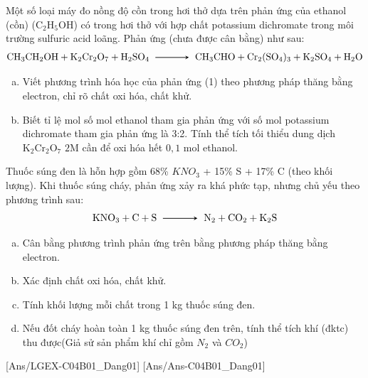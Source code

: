 	\begin{bt}
		Một số loại máy đo nồng độ cồn trong hơi thở dựa trên phản ứng của ethanol (cồn) ($\mathrm{C}_2\mathrm{H}_5\mathrm{OH}$) có trong hơi thở với hợp chất potassium dichromate trong môi trường sulfuric acid loãng. Phản ứng (chưa được cân bằng) như sau:
		\[\mathrm{CH_3CH_2OH} + \mathrm{K_2Cr_2O_7} + \mathrm{H_2SO_4} \xrightarrow \mathrm{CH_3CHO} + \mathrm{Cr_2(SO_4)_3} + \mathrm{K_2SO_4} + \mathrm{H_2O}
		\]
		\begin{enumerate}[a)]
			\item  Viết phương trình hóa học của phản ứng (1) theo phương pháp thăng bằng electron, chỉ rõ chất oxi hóa, chất khử.
			\item  Biết tỉ lệ mol số mol ethanol tham gia phản ứng với số mol potassium dichromate tham gia phản ứng là 3:2. Tính thể tích tối thiểu dung dịch $\mathrm{K}_2\mathrm{Cr}_2\mathrm{O}_7$  $2\mathrm{M}$ cần để oxi hóa hết $0{,}1$ mol ethanol.
		\end{enumerate}
		\loigiai{}
	\end{bt}
	\begin{bt}
		Thuốc súng đen là hỗn hợp gồm 68\% $KNO_3$ + 15\% S + 17\% C (theo khối lượng). Khi thuốc súng cháy, phản ứng xảy ra khá phức tạp, nhưng chủ yếu theo phương trình sau:
		\[\mathrm{KNO_3} + \mathrm{C} + \mathrm{S} \xrightarrow \mathrm{N_2} + \mathrm{CO_2} + \mathrm{K_2S}\]
		\begin{enumerate}[a)]
			\item  Cân bằng phương trình phản ứng trên bằng phương pháp thăng bằng electron.
			\item  Xác định chất oxi hóa, chất khử.
			\item  Tính khối lượng mỗi chất trong 1 kg thuốc súng đen.
			\item  Nếu đốt cháy hoàn toàn 1 kg thuốc súng đen trên, tính thể tích khí (đktc)  thu được(Giả sử sản phẩm khí chỉ gồm $N_2$ và $CO_2$)
		\end{enumerate}
	\end{bt}
[Ans/LGEX-C04B01_Dang01]
[Ans/Ans-C04B01_Dang01]
